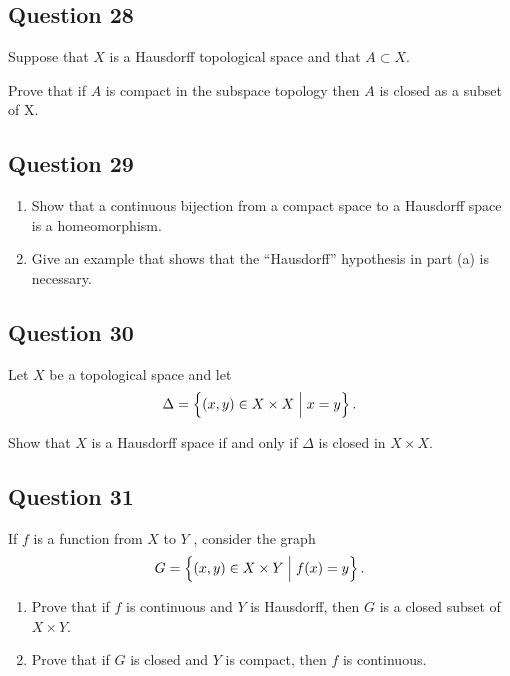 \documentclass[12pt]{article}
\begin{document}
\hypertarget{question-28-3}{%
\subsection{Question 28}\label{question-28-3}}

Suppose that \(X\) is a Hausdorff topological space and that
\(A \subset X\).

Prove that if \(A\) is compact in the subspace topology then \(A\) is
closed as a subset of X.

\hypertarget{question-29-3}{%
\subsection{Question 29}\label{question-29-3}}

\begin{enumerate}
\def\labelenumi{\alph{enumi}.}
\item
  Show that a continuous bijection from a compact space to a Hausdorff
  space is a homeomorphism.
\item
  Give an example that shows that the ``Hausdorff'' hypothesis in part
  (a) is necessary.
\end{enumerate}

\hypertarget{question-30-3}{%
\subsection{Question 30}\label{question-30-3}}

Let \(X\) be a topological space and let \[
\Delta = \left\{{(x, y) \in X \times X \mathrel{\Big|} x = y}\right\}
.\]

Show that \(X\) is a Hausdorff space if and only if \(\Delta\) is closed
in \(X \times X\).

\hypertarget{question-31-3}{%
\subsection{Question 31}\label{question-31-3}}

If \(f\) is a function from \(X\) to \(Y\) , consider the graph \[
G = \left\{{(x, y) \in X \times Y \mathrel{\Big|} f (x) = y}\right\}
.\]

\begin{enumerate}
\def\labelenumi{\alph{enumi}.}
\item
  Prove that if \(f\) is continuous and \(Y\) is Hausdorff, then \(G\)
  is a closed subset of \(X \times Y\).
\item
  Prove that if \(G\) is closed and \(Y\) is compact, then \(f\) is
  continuous.
\end{enumerate}
\end{document}
